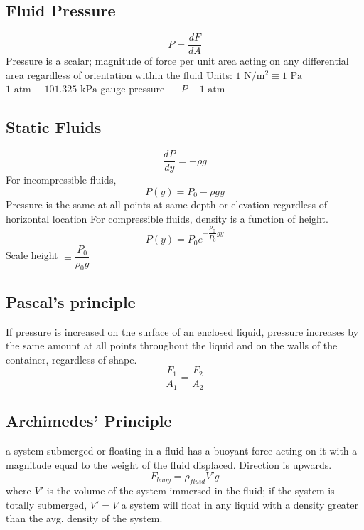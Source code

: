 \documentclass{article}
\begin{document}
\subsection{Fluid Pressure}
\begin{outline}
    \1 \[P=\dfrac{dF}{dA}\]
    \1 Pressure is a scalar; magnitude of force per unit area acting on any differential area regardless of orientation within the fluid
    \1 Units: $1\text{ N}/\text{m}^2\equiv1\text{ Pa}$
        \2 $1\text{ atm}\equiv101.325\text{ kPa}$
    \1 gauge pressure $\equiv P-1\text{ atm}$
\end{outline}
\subsection{Static Fluids}
\begin{outline}
\0 \[\dfrac{dP}{dy}=-\rho g\]
    \1 For incompressible fluids, \[P(y)=P_0-\rho gy\]
    \1 Pressure is the same  at all points at same depth or elevation regardless of horizontal location
    \1 For compressible fluids, density is a function of height.
\0 \[P(y)=P_0e^{-\dfrac{\rho_0}{P_0}gy}\]
    \1 Scale height $\equiv\dfrac{P_0}{\rho_0g}$
\end{outline}
\subsection{Pascal's principle}
\begin{outline}
    \1 If pressure is increased on the surface of an enclosed liquid, pressure increases by the same amount at all points throughout the liquid and on the walls of the container, regardless of shape. 
\0 \[\dfrac{F_1}{A_1}=\dfrac{F_2}{A_2}\]
\end{outline}
\subsection{Archimedes' Principle}
\begin{outline}
    \1 a system submerged or floating in a fluid has a buoyant force acting on it with a magnitude equal to the weight of the fluid displaced. Direction is upwards. \[F_{buoy}=\rho_{fluid}V'g\]
    \1 where $V'$ is the volume of the system immersed in the fluid; if the system is totally submerged, $V'=V$
    \1 a system will float in any liquid with a density greater than the avg. density of the system.
\end{outline}
\end{document}
